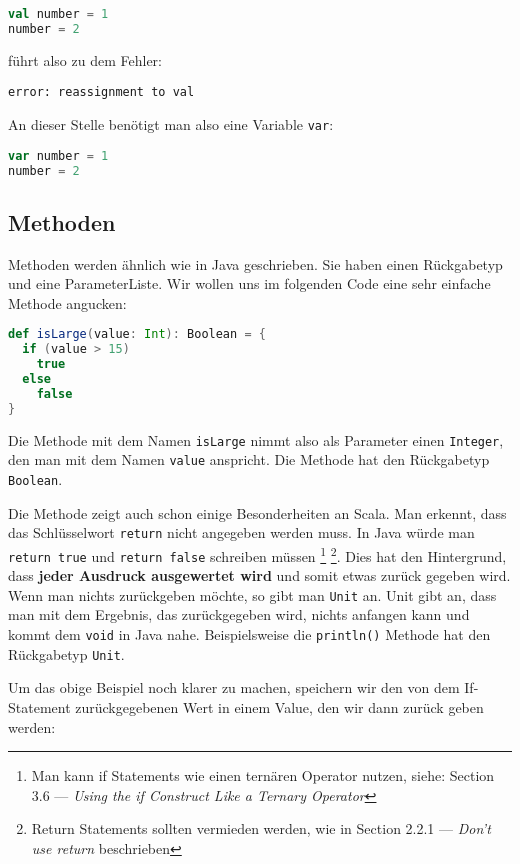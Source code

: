 \begin{lstlisting}[language=Scala,numbers=none]
val number = 1
number = 2
\end{lstlisting}

führt also zu dem Fehler:
\begin{verbatim}
error: reassignment to val
\end{verbatim}

An dieser Stelle benötigt man also eine Variable \texttt{var}:

\begin{lstlisting}[language=Scala,numbers=none]
var number = 1
number = 2
\end{lstlisting}

\subsection{Methoden}
Methoden werden ähnlich wie in Java geschrieben. Sie haben einen Rückgabetyp und eine ParameterListe. Wir wollen uns im folgenden Code eine sehr einfache Methode angucken:

\begin{lstlisting}[language=Scala]
def isLarge(value: Int): Boolean = {
  if (value > 15)
    true
  else
    false
}
\end{lstlisting}

Die Methode mit dem Namen \texttt{isLarge} nimmt also als Parameter einen \texttt{Integer}, den man mit dem Namen \texttt{value} anspricht. Die Methode hat den Rückgabetyp \texttt{Boolean}.

Die Methode zeigt auch schon einige Besonderheiten an Scala. Man erkennt, dass das Schlüsselwort \texttt{return} nicht angegeben werden muss. In Java würde man \texttt{return true} und \texttt{return false} schreiben müssen \footnote{Man kann if Statements wie einen ternären Operator nutzen, siehe: \cite{ScalaCookbook} Section 3.6 --- \textit{Using the if Construct Like a Ternary Operator}} \footnote{Return Statements sollten vermieden werden, wie in \cite{ScalaInDepth} Section 2.2.1 --- \textit{Don't use return} beschrieben}. Dies hat den Hintergrund, dass \textbf{jeder Ausdruck ausgewertet wird} und somit etwas zurück gegeben wird. Wenn man nichts zurückgeben möchte, so gibt man \texttt{Unit} an. Unit gibt an, dass man mit dem Ergebnis, das zurückgegeben wird, nichts anfangen kann und kommt dem \texttt{void} in Java nahe. Beispielsweise die \texttt{println()} Methode hat den Rückgabetyp \texttt{Unit}.

Um das obige Beispiel noch klarer zu machen, speichern wir den von dem If-Statement zurückgegebenen Wert in einem Value, den wir dann zurück geben werden:

